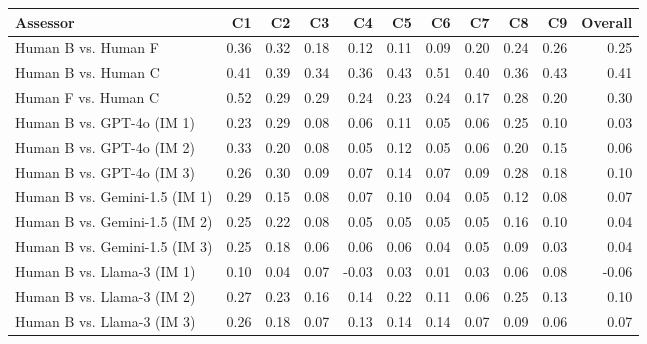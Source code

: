 \begin{table*}[]
    \footnotesize
    \centering

\begin{tabular}{lrrrrrrrrrr}
\toprule
                            Assessor &   C1 &   C2 &   C3 &    C4 &   C5 &   C6 &   C7 &   C8 &   C9 &  Overall \\
\midrule \midrule
                             Human B vs. Human F & 0.36 & 0.32 & 0.18 &  0.12 & 0.11 & 0.09 & 0.20 & 0.24 & 0.26 &     0.25 \\
                             Human B vs. Human C & 0.41 & 0.39 & 0.34 &  0.36 & 0.43 & 0.51 & 0.40 & 0.36 & 0.43 &     0.41 \\
                             Human F vs. Human C & 0.52 & 0.29 & 0.29 &  0.24 & 0.23 & 0.24 & 0.17 & 0.28 & 0.20 &     0.30 \\ \midrule \midrule
                             
                 Human B vs. GPT-4o (IM 1) & 0.23 & 0.29 & 0.08 &  0.06 & 0.11 & 0.05 & 0.06 & 0.25 & 0.10 &     0.03 \\
                 Human B vs. GPT-4o (IM 2) & 0.33 & 0.20 & 0.08 &  0.05 & 0.12 & 0.05 & 0.06 & 0.20 & 0.15 &     0.06 \\
                 Human B vs. GPT-4o (IM 3) & 0.26 & 0.30 & 0.09 &  0.07 & 0.14 & 0.07 & 0.09 & 0.28 & 0.18 &     0.10 \\ [0.15cm]
                 
             Human B vs. Gemini-1.5 (IM 1) & 0.29 & 0.15 & 0.08 &  0.07 & 0.10 & 0.04 & 0.05 & 0.12 & 0.08 &     0.07 \\
             Human B vs. Gemini-1.5 (IM 2) & 0.25 & 0.22 & 0.08 &  0.05 & 0.05 & 0.05 & 0.05 & 0.16 & 0.10 &     0.04 \\
             Human B vs. Gemini-1.5 (IM 3) & 0.25 & 0.18 & 0.06 &  0.06 & 0.06 & 0.04 & 0.05 & 0.09 & 0.03 &     0.04 \\ [0.15cm]
             
                Human B vs. Llama-3 (IM 1) & 0.10 & 0.04 & 0.07 & -0.03 & 0.03 & 0.01 & 0.03 & 0.06 & 0.08 &    -0.06 \\
                Human B vs. Llama-3 (IM 2) & 0.27 & 0.23 & 0.16 &  0.14 & 0.22 & 0.11 & 0.06 & 0.25 & 0.13 &     0.10 \\
                Human B vs. Llama-3 (IM 3) & 0.26 & 0.18 & 0.07 &  0.13 & 0.14 & 0.14 & 0.07 & 0.09 & 0.06 &     0.07 \\ \midrule
                

\end{tabular}
\end{table*}
